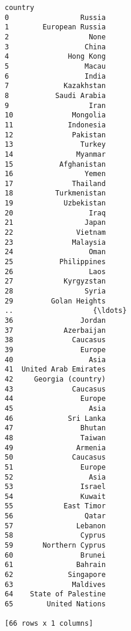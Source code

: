 \documentclass[11pt]{article}
\begin{document}
    \begin{Verbatim}[commandchars=\\\{\}]
                 country
0                 Russia
1        European Russia
2                   None
3                  China
4              Hong Kong
5                  Macau
6                  India
7             Kazakhstan
8           Saudi Arabia
9                   Iran
10              Mongolia
11             Indonesia
12              Pakistan
13                Turkey
14               Myanmar
15           Afghanistan
16                 Yemen
17              Thailand
18          Turkmenistan
19            Uzbekistan
20                  Iraq
21                 Japan
22               Vietnam
23              Malaysia
24                  Oman
25           Philippines
26                  Laos
27            Kyrgyzstan
28                 Syria
29         Golan Heights
..                   {\ldots}
36                Jordan
37            Azerbaijan
38              Caucasus
39                Europe
40                  Asia
41  United Arab Emirates
42     Georgia (country)
43              Caucasus
44                Europe
45                  Asia
46             Sri Lanka
47                Bhutan
48                Taiwan
49               Armenia
50              Caucasus
51                Europe
52                  Asia
53                Israel
54                Kuwait
55            East Timor
56                 Qatar
57               Lebanon
58                Cyprus
59       Northern Cyprus
60                Brunei
61               Bahrain
62             Singapore
63              Maldives
64    State of Palestine
65        United Nations

[66 rows x 1 columns]

    \end{Verbatim}


    
    
    
    
\end{document}
